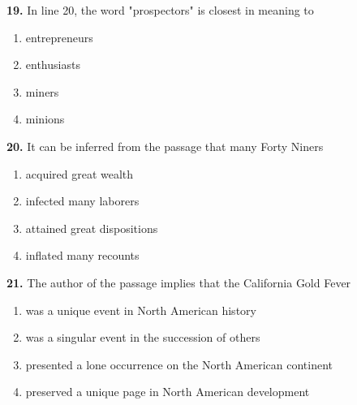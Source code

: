 \documentclass[12pt]{article}
\begin{document}
\noindent\textbf{19.} In line 20, the word "prospectors" is closest in meaning to
\begin{enumerate}[label=(\Alph*),leftmargin=*,itemsep=0.2em]
\item entrepreneurs
\item enthusiasts
\item miners
\item minions
\end{enumerate}
\par
\vspace{0.25\baselineskip}
\noindent\textbf{20.} It can be inferred from the passage that many Forty Niners
\begin{enumerate}[label=(\Alph*),leftmargin=*,itemsep=0.2em]
\item acquired great wealth
\item infected many laborers
\item attained great dispositions
\item inflated many recounts
\end{enumerate}
\par
\vspace{0.25\baselineskip}
\noindent\textbf{21.} The author of the passage implies that the California Gold Fever
\begin{enumerate}[label=(\Alph*),leftmargin=*,itemsep=0.2em]
\item was a unique event in North American history
\item was a singular event in the succession of others
\item presented a lone occurrence on the North American continent
\item preserved a unique page in North American development
\end{enumerate}
\par
\vspace{0.25\baselineskip}
\end{document}
